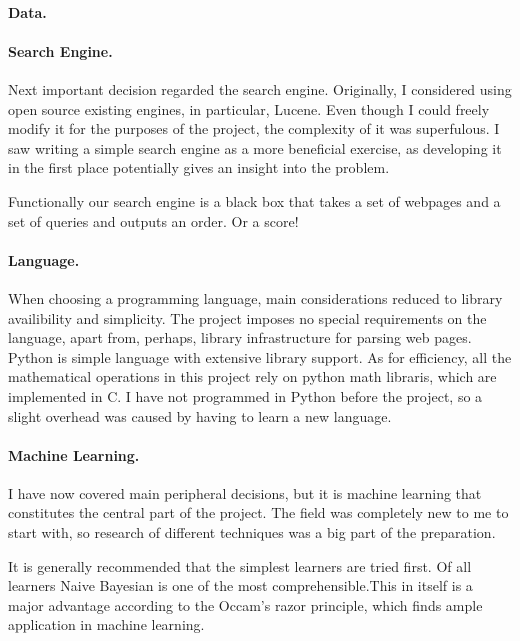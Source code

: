 \documentclass[12pt,twoside,notitlepage]{report}
\begin{document}
\paragraph{Data.}

\paragraph{Search Engine.}

Next important decision regarded the search engine.  Originally, I considered
using open source existing engines, in particular, Lucene. Even though I could
freely modify it for the purposes of the project, the complexity of it was
superfulous. I saw writing a simple search engine as a more beneficial
exercise, as developing it in the first place potentially gives an insight into
the problem.

Functionally our search engine is a black box that takes a set of webpages and
a set of queries and outputs an order. Or a score!

\paragraph{Language.}

When choosing a programming language, main considerations reduced to library
availibility and simplicity. The project imposes no special  requirements on the
language, apart from, perhaps, library infrastructure for parsing web pages.
Python is simple language with extensive library support. As
for efficiency, all the mathematical operations in this project rely on python
math libraris, which are implemented in C. I have not programmed in Python
before the project, so a slight overhead was caused by having to learn a new
language.

\paragraph{Machine Learning.}

I have now covered main peripheral decisions, but it is machine learning that
constitutes the central part of the project. The field was completely new to me
to start with, so research of different techniques was a big part of the
preparation.

It is generally recommended that the simplest learners are tried
first\cite{domingos}. Of all learners Naive Bayesian is one of the most
comprehensible.This in itself is a major advantage according to the Occam's
razor principle, which finds ample application in machine learning.
\end{document}
